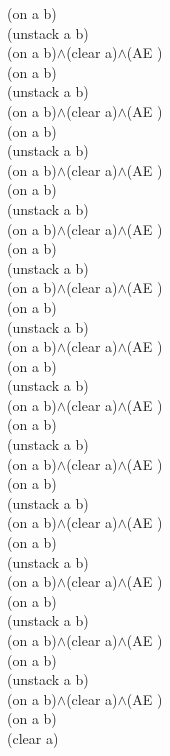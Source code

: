 {{(on a b)\\
(unstack a b)\\
(on a b)$\wedge$(clear a)$\wedge$(AE )\\
(on a b)\\
(unstack a b)\\
(on a b)$\wedge$(clear a)$\wedge$(AE )\\
(on a b)\\
(unstack a b)\\
(on a b)$\wedge$(clear a)$\wedge$(AE )\\
(on a b)\\
(unstack a b)\\
(on a b)$\wedge$(clear a)$\wedge$(AE )\\
(on a b)\\
(unstack a b)\\
(on a b)$\wedge$(clear a)$\wedge$(AE )\\
(on a b)\\
(unstack a b)\\
(on a b)$\wedge$(clear a)$\wedge$(AE )\\
(on a b)\\
(unstack a b)\\
(on a b)$\wedge$(clear a)$\wedge$(AE )\\
(on a b)\\
(unstack a b)\\
(on a b)$\wedge$(clear a)$\wedge$(AE )\\
(on a b)\\
(unstack a b)\\
(on a b)$\wedge$(clear a)$\wedge$(AE )\\
(on a b)\\
(unstack a b)\\
(on a b)$\wedge$(clear a)$\wedge$(AE )\\
(on a b)\\
(unstack a b)\\
(on a b)$\wedge$(clear a)$\wedge$(AE )\\
(on a b)\\
(unstack a b)\\
(on a b)$\wedge$(clear a)$\wedge$(AE )\\
(on a b)\\
(clear a)\\
}%
}

